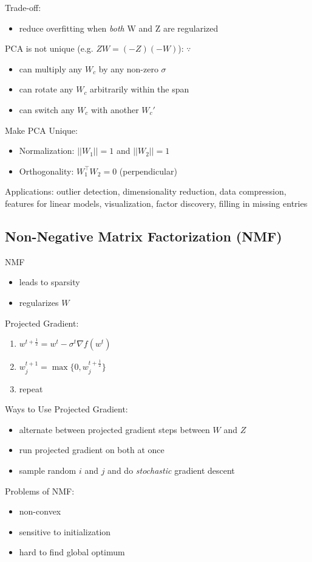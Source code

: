 \documentclass[10pt,landscape,a4paper]{article}
\begin{document}
\begin{multicols*}{5}
\begin{enumerate}
\end{enumerate}
Trade-off:
\begin{itemize}
    \item reduce overfitting when \emph{both} W and Z are regularized
\end{itemize}
PCA is not unique (e.g. \(ZW = (-Z)(-W)\)): \(\because\)
\begin{itemize}
    \item can multiply any \(W_c\) by any non-zero \(\sigma\)
    \item can rotate any \(W_c\) arbitrarily within the span
    \item can switch any \(W_c\) with another \(W_c'\)
\end{itemize}
Make PCA Unique:
\begin{itemize}
    \item Normalization: \(||W_1|| = 1\) and \(||W_2|| = 1\)
    \item Orthogonality: \(W_1^\intercal W_2 = 0\) (perpendicular)
\end{itemize}
Applications: outlier detection, dimensionality reduction, data compression, features for linear models, visualization, factor discovery, filling in missing entries \\

\subsection{Non-Negative Matrix Factorization (NMF)}
NMF
\begin{itemize}
    \item leads to sparsity
    \item regularizes \(W\)
\end{itemize}
Projected Gradient:
\begin{enumerate}
    \item \(w^{t+\frac{1}{2}} = w^t - \sigma^t \nabla f(w^t)\)
    \item \(w_j^{t+1} = \max \{0, w_j^{t+\frac{1}{2}}\} \)
    \item repeat
\end{enumerate}
Ways to Use Projected Gradient:
\begin{itemize}
    \item alternate between projected gradient steps between \(W\) and \(Z\)
    \item run projected gradient on both at once
    \item sample random \(i\) and \(j\) and do \emph{stochastic} gradient descent
\end{itemize}
Problems of NMF:
\begin{itemize}
    \item non-convex
    \item sensitive to initialization
    \item hard to find global optimum
\end{itemize}


\end{multicols*}
\end{document}
